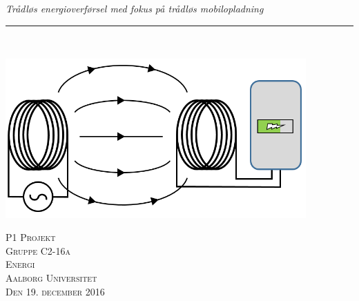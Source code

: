 
\thispagestyle{empty}
\begin{flushright}
\vspace{3cm}

\phantom{hul}

\phantom{hul}

\phantom{hul}

\textsl{\Huge Trådløs energioverførsel med fokus på trådløs mobilopladning} \\ \vspace{1cm}

\rule{13cm}{3mm} \\ \vspace{1.5cm}
\vspace{1cm}

\includegraphics[width=0.864\textwidth]{Setup/Forsidebillede}

\vspace{2cm} 
\textsc{\Large P1 Projekt \\
Gruppe C2-16a \\
Energi\\
Aalborg Universitet\\
Den 19. december 2016\\}
\end{flushright}

\newpage
